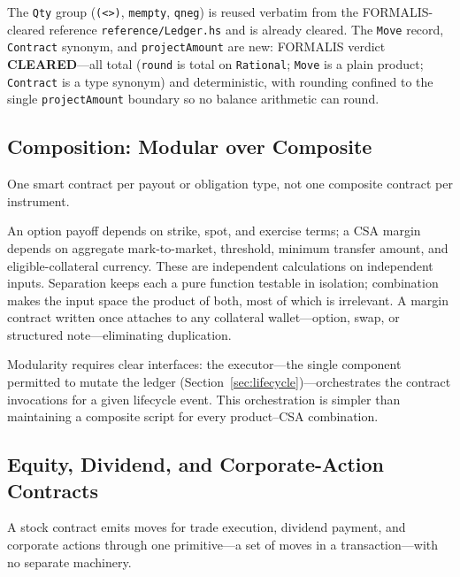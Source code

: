 \begin{remark}
The \texttt{Qty} group (\texttt{(<>)}, \texttt{mempty}, \texttt{qneg}) is reused verbatim from the FORMALIS-cleared reference \texttt{reference/Ledger.hs} and is already cleared. The \texttt{Move} record, \texttt{Contract} synonym, and \texttt{projectAmount} are new: FORMALIS verdict \textbf{CLEARED}---all total (\texttt{round} is total on \texttt{Rational}; \texttt{Move} is a plain product; \texttt{Contract} is a type synonym) and deterministic, with rounding confined to the single \texttt{projectAmount} boundary so no balance arithmetic can round.
\end{remark}

\subsection{Composition: Modular over Composite}

\begin{principle}
One smart contract per payout or obligation type, not one composite contract per instrument.
\end{principle}

\noindent An option payoff depends on strike, spot, and exercise terms; a CSA margin depends on aggregate mark-to-market, threshold, minimum transfer amount, and eligible-collateral currency. These are independent calculations on independent inputs. Separation keeps each a pure function testable in isolation; combination makes the input space the product of both, most of which is irrelevant. A margin contract written once attaches to any collateral wallet---option, swap, or structured note---eliminating duplication.

Modularity requires clear interfaces: the executor---the single component permitted to mutate the ledger (Section~\ref{sec:lifecycle})---orchestrates the contract invocations for a given lifecycle event. This orchestration is simpler than maintaining a composite script for every product--CSA combination.

\subsection{Equity, Dividend, and Corporate-Action Contracts}

A stock contract emits moves for trade execution, dividend payment, and corporate actions through one primitive---a set of moves in a transaction---with no separate machinery.

